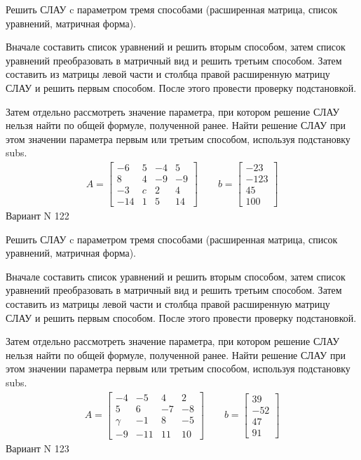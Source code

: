 \documentclass[11pt]{report}
\begin{document}
Решить СЛАУ c параметром тремя способами (расширенная матрица, список уравнений, матричная форма).

Вначале составить список уравнений и решить вторым способом,
затем список уравнений преобразовать в матричный вид и решить третьим способом.
Затем составить из матрицы левой части и столбца правой расширенную матрицу СЛАУ и решить первым способом.
После этого провести проверку подстановкой.

Затем отдельно рассмотреть значение параметра, при котором решение СЛАУ нельзя найти по общей формуле,
полученной ранее.
Найти решение СЛАУ при этом значении параметра первым или третьим способом, используя подстановку subs.
\begin{align*}
    A = \left[\begin{matrix}-6 & 5 & -4 & 5\\8 & 4 & -9 & -9\\-3 & c & 2 & 4\\-14 & 1 & 5 & 14\end{matrix}\right]
\qquad b = \left[\begin{matrix}-23\\-123\\45\\100\end{matrix}\right]
\end{align*}
\newpage
Вариант N 122


Решить СЛАУ c параметром тремя способами (расширенная матрица, список уравнений, матричная форма).

Вначале составить список уравнений и решить вторым способом,
затем список уравнений преобразовать в матричный вид и решить третьим способом.
Затем составить из матрицы левой части и столбца правой расширенную матрицу СЛАУ и решить первым способом.
После этого провести проверку подстановкой.

Затем отдельно рассмотреть значение параметра, при котором решение СЛАУ нельзя найти по общей формуле,
полученной ранее.
Найти решение СЛАУ при этом значении параметра первым или третьим способом, используя подстановку subs.
\begin{align*}
    A = \left[\begin{matrix}-4 & -5 & 4 & 2\\5 & 6 & -7 & -8\\\gamma & -1 & 8 & -5\\-9 & -11 & 11 & 10\end{matrix}\right]
\qquad b = \left[\begin{matrix}39\\-52\\47\\91\end{matrix}\right]
\end{align*}
\newpage
Вариант N 123
\end{document}
